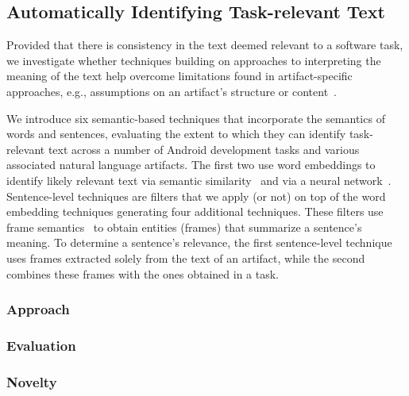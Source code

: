 

\subsection{Automatically Identifying Task-relevant Text}


Provided that there is consistency in the text deemed relevant to a software task, we investigate whether techniques building on approaches to interpreting the meaning of the text help overcome limitations found in artifact-specific approaches, e.g., assumptions on an artifact's structure or content~\red{\cite{}}.



We introduce six semantic-based techniques that incorporate the semantics of words and sentences, evaluating the extent to which they can identify task-relevant text 
across a number of Android development tasks and various associated natural language artifacts.
The first two use word embeddings to identify likely relevant text via semantic similarity~\cite{Mikolov2013} and via a  neural network~\red{\cite{}}.
Sentence-level techniques are filters that we apply (or not) on top of the word embedding techniques generating four additional techniques.
These filters use frame semantics~\cite{fillmore1976frame} to obtain entities (frames) that summarize a sentence's meaning.
To determine a sentence's relevance, the first sentence-level technique uses frames extracted solely from the text of an artifact, while the second combines these frames with the ones obtained in a task.



\subsubsection{Approach}



\subsubsection{Evaluation}



\subsubsection{Novelty}